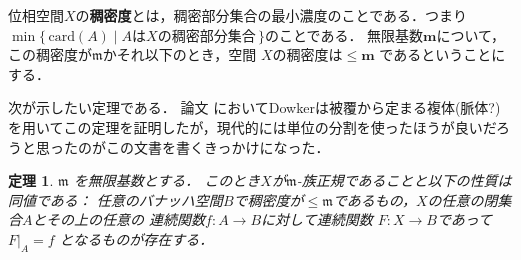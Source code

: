 \documentclass[leqno, a4paper, 12pt]{jsarticle}
\newtheorem{thm}{定理}
\newcommand{\card}{\mathrm{card}}
\begin{document}
位相空間$X$の\textbf{稠密度}とは，稠密部分集合の最小濃度のことである．つまり$\min\{\, \card(A)\mid \text{$A$は$X$の稠密部分集合}\, \}$のことである．
無限基数$\mathbf{m}$について，この稠密度が$\mathfrak{m}$かそれ以下のとき，空間
$X$の稠密度は$\le \mathbf{m}$
であるということにする．

次が示したい定理である．
論文\cite{dow}
においてDowkerは被覆から定まる複体(脈体?)を用いてこの定理を証明したが，現代的には単位の分割を使ったほうが良いだろうと思ったのがこの文書を書くきっかけになった．

\begin{thm}\label{thm:main}
$\mathfrak{m}$
を無限基数とする．
このとき$X$が$\mathfrak{m}$-族正規であることと以下の性質は同値である：
任意のバナッハ空間$B$で稠密度が$\le \mathfrak{m}$であるもの，$X$の任意の閉集合$A$とその上の任意の
連続関数$f\colon A\to B$に対して連続関数
$F\colon X\to B$であって$F|_{A}=f$
となるものが存在する．
\end{thm}
\end{document}
